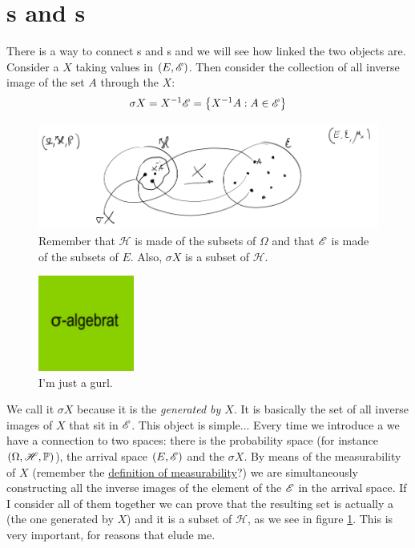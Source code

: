 \documentclass{report}
\begin{document}
\section{\sa s and \rv s}
There is a way to connect \sa s and \rv s and we will see how linked the two objects are. Consider a \rv{} $X$ taking values in $(E,\mathscr{E})$. Then consider the collection of all inverse image of the set $A$ through the \rv{} $X$:
\[\sigma X=X^{-1}\mathscr{E}=\left\{X^{-1}A:A\in\mathscr{E}\right\}\]
\begin{figure}[H]
	\centering
	\includegraphics[width=0.9\linewidth]{screenshot005}
	\caption[Professor Polito draws circles and arrows]{Remember that $\mathscr{H}$ is made of the subsets of $\Omega$ and that $\mathscr{E}$ is made of the subsets of $E$. Also, $\sigma X$ is a subset of $\mathscr{H}$.}
	\label{fig:screenshot005}
\end{figure}
\begin{figure}
	\centering
	\includegraphics[width=0.28\textwidth]{brat}
	\caption[I'm so Julia]{I'm just a gurl\protect\footnotemark.}
	\label{fig:brat}
\end{figure}
We call it $\sigma X$ because it is the \emph{\sa{} generated by $X$}. It is basically the set of all inverse images of $X$ that sit in $\mathscr{E}$. 
This object is simple... 
Every time we introduce a \rv{} we have a connection to two spaces: there is the probability space (for instance $(\Omega,\mathscr{H},\mathbb{P})$), the arrival space $(E,\mathscr{E})$ and the \sa{} $\sigma X$. 
By means of the measurability of $X$ (remember the \hyperref[measur]{definition of measurability}?) we are simultaneously constructing all the inverse images of the element of the \sa{} $\mathscr{E}$ in the arrival space. 
If I consider all of them together we can prove that the resulting set is actually a \sa{} (the one generated by $X$) and it is a subset of $\mathscr{H}$, as we see in figure \ref{fig:screenshot005}. This is very important, for reasons that elude me.\par
\end{document}
